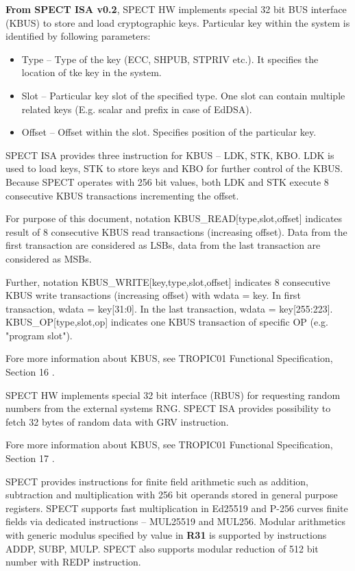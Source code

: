 \documentclass[notconfidential]{tropic_design_spec}
\begin{document}
\textbf{From SPECT ISA v0.2}, SPECT HW implements special 32 bit BUS interface (KBUS) to store and load cryptographic keys.
Particular key within the system is identified by following parameters:
\begin{itemize}
    \item Type -- Type of the key (ECC, SHPUB, STPRIV etc.). It specifies the location
                  of tke key in the system.
    \item Slot -- Particular key slot of the specified type. One slot can contain multiple related keys
                  (E.g. scalar and prefix in case of EdDSA).
    \item Offset -- Offset within the slot. Specifies position of the particular key.
\end{itemize}

SPECT ISA provides three instruction for KBUS -- LDK, STK, KBO. LDK is used to load keys, STK to store keys
and KBO for further control of the KBUS. Because SPECT operates with 256 bit values, both LDK and STK execute 8
consecutive KBUS transactions incrementing the offset.

For purpose of this document, notation KBUS_READ[type,slot,offset] indicates result of 8 consecutive
KBUS read transactions (increasing offset). Data from the first transaction are considered as LSBs,
data from the last transaction are considered as MSBs.

Further, notation KBUS_WRITE[key,type,slot,offset] indicates 8 consecutive KBUS write transactions (increasing offset)
with wdata = key. In first transaction, wdata = key[31:0]. In the last transaction, wdata = key[255:223].
KBUS_OP[type,slot,op] indicates one KBUS transaction of specific OP (e.g. "program slot").

Fore more information about KBUS, see TROPIC01 Functional Specification, Section 16 \cite{TROPIC01}.


SPECT HW implements special 32 bit interface (RBUS) for requesting random numbers from the external systems RNG.
SPECT ISA provides possibility to fetch 32 bytes of random data with GRV instruction.

Fore more information about KBUS, see TROPIC01 Functional Specification, Section 17 \cite{TROPIC01}.


SPECT provides instructions for finite field arithmetic such as
addition, subtraction and multiplication with 256 bit operands stored in general purpose
registers. SPECT supports fast multiplication in Ed25519 and P-256 curves finite fields
via dedicated instructions -- MUL25519 and MUL256. Modular arithmetics with generic modulus
specified by value in \textbf{R31} is supported by instructions ADDP, SUBP, MULP. SPECT
also supports modular reduction of 512 bit number with REDP instruction.
\end{document}
